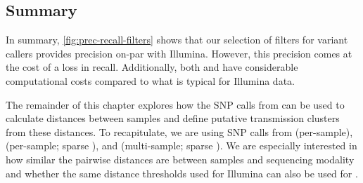 \begin{table}
\centering
{}
\caption{CPU and wall clock time, and memory (RAM) usage for the main steps of running \pandora{}'s multi-sample routine . Sparse and Dense refer to two different densities with respect to the number of variants used. All steps were run on a single compute node with 32 CPU cores. MSA=multiple sequence alignment; PRG=population reference graph.}
\label{tab:compare-perf}
\end{table}

\subsection{Summary}
\label{sec:var-summary}

In summary, \autoref{fig:prec-recall-filters} shows that our selection of filters for \ont{} variant callers provides precision on-par with Illumina. However, this precision comes at the cost of a loss in recall. Additionally, both \bcftools{} and \pandora{} have considerable computational costs compared to what is typical for Illumina data.

The remainder of this chapter explores how the SNP calls from \ont{} can be used to calculate distances between samples and define putative transmission clusters from these distances. To recapitulate, we are using SNP calls from \bcftools{} (per-sample), \map{} (per-sample; sparse \panrg{}), and \compare{} (multi-sample; sparse \panrg{}). We are especially interested in how similar the pairwise distances are between samples and sequencing modality and whether the same distance thresholds used for Illumina can also be used for \ont{}.

